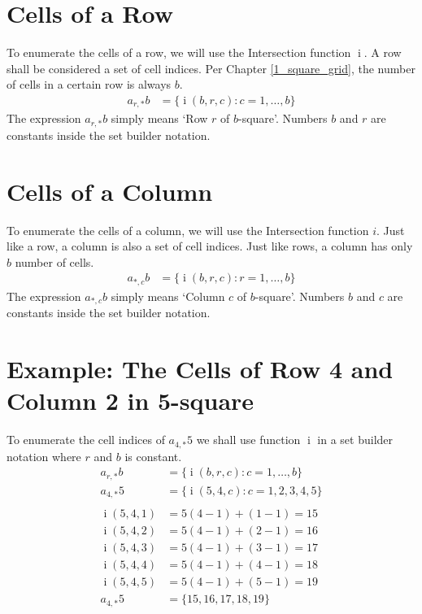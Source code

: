 \documentclass[twoside,openany,12pt]{book}
\begin{document}
    \section{Cells of a Row} \label{row_cells}
    To enumerate the cells of a row, we will use the Intersection function $\operatorname{i}$. A row shall be considered a set of cell indices. Per Chapter \ref{1_square_grid}, the number of cells in a certain row is always $b$.
    \begin{equation}
        \begin{split}
            a_{r,*}b &= \{ \operatorname{i}(b,r,c) : c = 1, \dots, b \}
        \end{split}
    \end{equation}
    The expression $a_{r,*}b$ simply means `Row $r$ of $b$-square'. Numbers $b$ and $r$ are constants inside the set builder notation.

    \section{Cells of a Column} \label{column_cells}
    To enumerate the cells of a column, we will use the Intersection function $i$. Just like a row, a column is also a set of cell indices. Just like rows, a column has only $b$ number of cells.
    \begin{equation}
        \begin{split}
            a_{*,c}b &= \{ \operatorname{i}(b,r,c) : r = 1, \dots, b \}
        \end{split}
    \end{equation}
    The expression $a_{*,c}b$ simply means `Column $c$ of $b$-square'. Numbers $b$ and $c$ are constants inside the set builder notation.

    \section{Example: The Cells of Row 4 and Column 2 in 5-square} \label{2_example_1}
    To enumerate the cell indices of $a_{4,*}5$ we shall use function $\operatorname{i}$ in a set builder notation where $r$ and $b$ is constant.
    \begin{equation*}
        \begin{split}
            a_{r,*}b &= \{ \operatorname{i}(b,r,c) : c = 1, \dots, b \} \\
            a_{4,*}5 &= \{ \operatorname{i}(5,4,c) : c = 1,2,3,4,5 \} \\
            \\
            \operatorname{i}(5,4,1) &= 5(4-1) + (1 - 1) = 15 \\
            \operatorname{i}(5,4,2) &= 5(4-1) + (2 - 1) = 16 \\
            \operatorname{i}(5,4,3) &= 5(4-1) + (3 - 1) = 17 \\
            \operatorname{i}(5,4,4) &= 5(4-1) + (4 - 1) = 18 \\
            \operatorname{i}(5,4,5) &= 5(4-1) + (5 - 1) = 19 \\
            a_{4,*}5 &= \{15, 16, 17, 18, 19 \} \\
        \end{split}
    \end{equation*}
\end{document}
